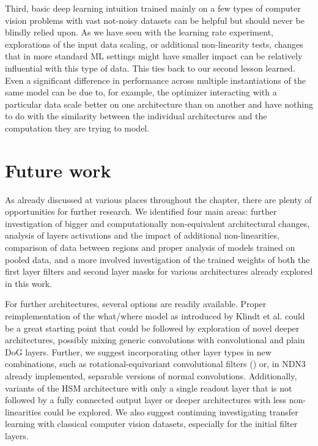 Third, basic deep learning intuition trained mainly on a few types of computer vision problems with vast not-noisy datasets can be helpful but should never be blindly relied upon. As we have seen with the learning rate experiment, explorations of the input data scaling, or additional non-linearity tests, changes that in more standard ML settings might have smaller impact can be relatively influential with this type of data. This ties back to our second lesson learned. Even a significant difference in performance across multiple instantiations of the same model can be due to, for example, the optimizer interacting with a particular data scale better on one architecture than on another and have nothing to do with the similarity between the individual architectures and the computation they are trying to model.

\section*{Future work}

As already discussed at various places throughout the  chapter, there are plenty of opportunities for further research. We identified four main areas: further investigation of bigger and computationally non-equivalent architectural changes, analysis of layers activations and the impact of additional non-linearities, comparison of data between regions and proper analysis of models trained on pooled data, and a more involved investigation of the trained weights of both the first layer filters and second layer masks for various architectures already explored in this work.

For further architectures, several options are readily available. Proper reimplementation of the what/where model as introduced by Klindt et al. could be a great starting point that could be followed by exploration of novel deeper architectures, possibly mixing generic convolutions with convolutional and plain DoG layers. Further, we suggest incorporating other layer types in new combinations, such as rotational-equivariant convolutional filters (\cite{ecker}) or, in NDN3 already implemented, separable versions of normal convolutions. Additionally, variants of the HSM architecture with only a single readout layer that is not followed by a fully connected output layer or deeper architectures with less non-linearities could be explored. We also suggest continuing investigating transfer learning with classical computer vision datasets, especially for the initial filter layers. 

